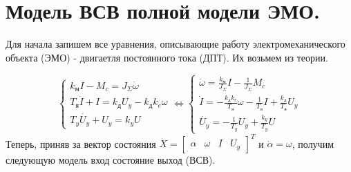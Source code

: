 \documentclass[a4paper, 11pt]{article}
\begin{document}
\section*{Модель ВСВ полной модели ЭМО.}
Для начала запишем все уравнения, описывающие работу электромеханического объекта (ЭМО) - двигаетля постоянного тока (ДПТ). Их возьмем из теории.

\begin{equation}
    \begin{cases}
        k_\text{м}I - M_c = J_\Sigma \dot{\omega} \\
        T_\text{я}\dot{I} + I = k_\text{д}U_y - k_\text{д}k_e\omega \\
        T_y\dot{U_y} + U_y = k_yU
    \end{cases} \Leftrightarrow
    \begin{cases}
        \dot{\omega} = \frac{k_\text{м}}{J_\Sigma}I - \frac{1}{J_\Sigma}M_c \\
        \dot{I} = - \frac{k_\text{д}k_e}{T_\text{я}}\omega - \frac{1}{T_\text{я}}I + \frac{k_\text{д}}{T_\text{я}}U_y \\
        \dot{U_y} = -\frac{1}{T_y}U_y + \frac{k_y}{T_y}U
    \end{cases}
\end{equation}
Теперь, приняв за вектор состояния $X = \begin{bmatrix} \alpha & \omega & I & U_y \end{bmatrix}^T$ и $\dot{\alpha} = \omega$, получим следующую модель вход состояние выход (ВСВ).
\end{document}
